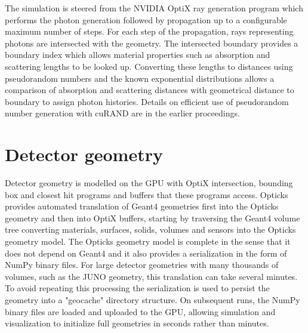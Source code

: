 \documentclass{webofc}
\begin{document}
The simulation is steered from the NVIDIA OptiX ray generation program which 
performs the photon generation followed by propagation up to a configurable maximum 
number of steps. For each step of the propagation, rays representing photons are intersected
with the geometry. The intersected boundary provides a boundary index which allows 
material properties such as absorption and scattering lengths to be looked up. 
Converting these lengths to distances using pseudorandom numbers and 
the known exponential distributions allows a comparison of absorption and scattering distances 
with geometrical distance to boundary to assign photon histories. 
Details on efficient use of pseudorandom number generation with cuRAND\cite{curandURL} are in the 
earlier proceedings\cite{chep2016}.
%
%
%
\section{Detector geometry} 
%
%
Detector geometry is modelled on the GPU with OptiX intersection, bounding box 
and closest hit programs and buffers that these programs access.
Opticks provides automated translation of Geant4 geometries first into the Opticks geometry and then into OptiX buffers, starting 
by traversing the Geant4 volume tree converting materials, surfaces, solids, volumes and sensors 
into the Opticks geometry model.  The Opticks geometry model is complete 
in the sense that it does not depend on Geant4 and it also provides a serialization in the 
form of NumPy\cite{numpy} binary files. 
%
For large detector geometries with many thousands of volumes, such as the JUNO geometry, 
this translation can take several minutes. To avoid repeating this processing the serialization 
is used to persist the geometry into a "geocache" directory structure.
On subsequent runs, the NumPy binary files are loaded and uploaded to the GPU, allowing simulation and 
visualization to initialize full geometries in seconds rather than minutes.
%
\end{document}
